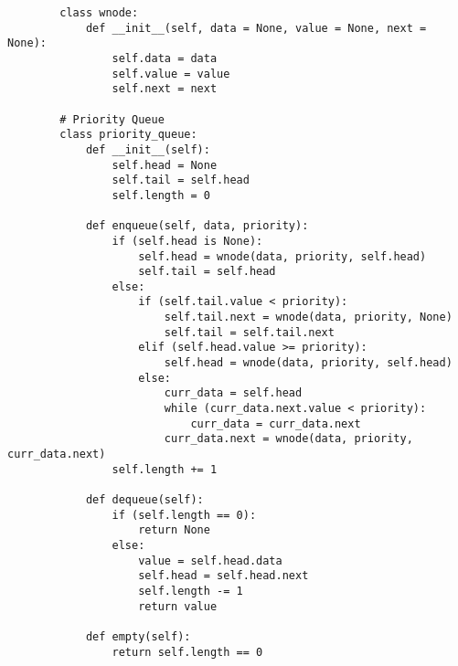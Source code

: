     \begin{lstlisting}
        class wnode:
            def __init__(self, data = None, value = None, next = None):
                self.data = data
                self.value = value
                self.next = next

        # Priority Queue
        class priority_queue:
            def __init__(self):
                self.head = None
                self.tail = self.head
                self.length = 0
            
            def enqueue(self, data, priority):
                if (self.head is None):
                    self.head = wnode(data, priority, self.head)
                    self.tail = self.head
                else:
                    if (self.tail.value < priority):
                        self.tail.next = wnode(data, priority, None)
                        self.tail = self.tail.next
                    elif (self.head.value >= priority):
                        self.head = wnode(data, priority, self.head)
                    else:
                        curr_data = self.head
                        while (curr_data.next.value < priority):
                            curr_data = curr_data.next
                        curr_data.next = wnode(data, priority, curr_data.next)
                self.length += 1
                
            def dequeue(self):
                if (self.length == 0):
                    return None
                else:
                    value = self.head.data
                    self.head = self.head.next
                    self.length -= 1
                    return value
            
            def empty(self):
                return self.length == 0
    \end{lstlisting}

    \newpage

